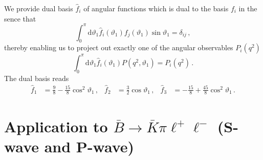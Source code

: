 \documentclass[aps,prd,reprint,nofootinbib,preprintnumbers]{revtex4}
\newcommand{\dd}{\text{d}}
\renewcommand{\theta}{\vartheta}
\begin{document}
We provide dual basis $\hat{f}_i$ of angular functions which is dual to the basis $f_i$ in the sence that
\begin{equation}
    \int_0^\pi \dd\theta_1 \hat{f}_i(\theta_1) f_j(\theta_1) \sin\theta_1 = \delta_{ij}\,,
\end{equation}
thereby enabling us to project out exactly one of the angular
observables $P_i(q^2)$
\begin{equation}
    \int_0^\pi \dd \theta_1\hat{f}_i(\theta_1) P(q^2, \theta_1) = P_i(q^2)\,.
\end{equation}
The dual basis reads
\begin{equation}
\begin{aligned}
    \hat{f}_1 & = \frac{9}{8} - \frac{15}{8}\cos^2\theta_1\,, &
    \hat{f}_2 & = \frac{3}{2}\cos\theta_1\,, &
    \hat{f}_3 & = -\frac{15}{8} + \frac{45}{8}\cos^2\theta_1\,.
\end{aligned}
\end{equation}

\section{Application to $\bar{B}\to\bar{K}\pi\ell^+\ell^-$ (S-wave and P-wave)}
\label{app:btokstarll}
\end{document}
